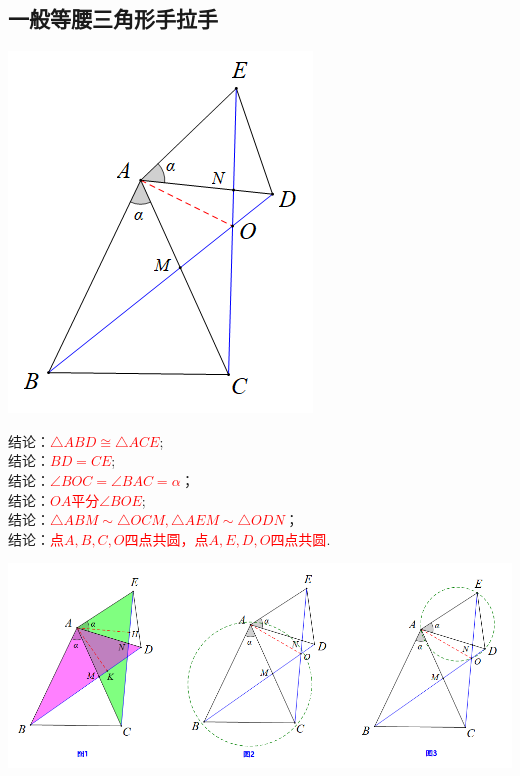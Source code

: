 \subsection{一般等腰三角形手拉手}
\begin{minipage}{0.4\textwidth}
\includegraphics[scale=0.6]{figure/shoulashou01}
\end{minipage}
\begin{minipage}{0.6\textwidth}
  结论：\textcolor{red}{$\triangle ABD\cong \triangle ACE$};\\
  结论：\textcolor{red}{$BD=CE$};\\
  结论：\textcolor{red}{$\angle BOC=\angle BAC=\alpha$}；\\
  结论：\textcolor{red}{$OA$平分$\angle BOE$};\\
  结论：\textcolor{red}{$\triangle ABM\sim \triangle OCM,\triangle AEM\sim \triangle ODN$}；\\
   结论：\textcolor{red}{点$A,B,C,O$四点共圆，点$A,E,D,O$四点共圆}.
\end{minipage}
\includegraphics[scale=0.6]{figure/shoulashou02}
